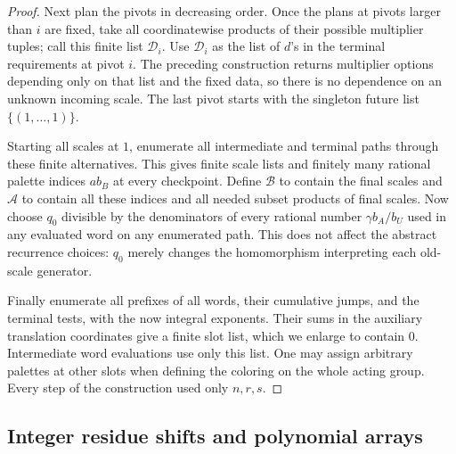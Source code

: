 \begin{proof}
Next plan the pivots in decreasing order.  Once the plans at pivots
larger than $i$ are fixed, take all coordinatewise products of their
possible multiplier tuples; call this finite list $\mathcal D_i$.
Use $\mathcal D_i$ as the list of $d$'s in the terminal requirements
at pivot $i$.  The preceding construction returns multiplier options
depending only on that list and the fixed data, so there is no
dependence on an unknown incoming scale.  The last pivot starts with
the singleton future list $\{(1,\ldots,1)\}$.

Starting all scales at $1$, enumerate all intermediate and terminal
paths through these finite alternatives.  This gives finite scale
lists and finitely many rational palette indices $a b_B$ at every
checkpoint.  Define $\mathcal B$ to contain the final scales and
$\mathcal A$ to contain all these indices and all needed subset
products of final scales.  Now choose $q_0$ divisible by the
denominators of every rational number $\gamma b_A/b_U$ used in any
evaluated word on any enumerated path.  This does not affect the
abstract recurrence choices: $q_0$ merely changes the homomorphism
interpreting each old-scale generator.

Finally enumerate all prefixes of all words, their cumulative jumps,
and the terminal tests, with the now integral exponents.  Their sums
in the auxiliary translation coordinates give a finite slot list,
which we enlarge to contain $0$.  Intermediate word evaluations use
only this list.  One may assign arbitrary palettes at other slots
when defining the coloring on the whole acting group.  Every step
of the construction used only $n,r,s$.
\end{proof}

\subsection{Integer residue shifts and polynomial arrays}

